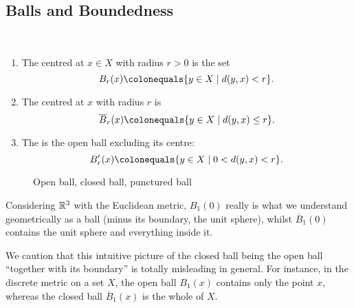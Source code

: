 \subsection{Balls and Boundedness}
\begin{definition}[Balls] \
\begin{enumerate}[label=(\roman*)]
\item The  centred at $x\in X$ with radius $r>0$ is the set
\[B_r(x)\colonequals\{y\in X\mid d(y,x)<r\}.\]
\item The  centred at $x$ with radius $r$ is
\[\overline{B}_r(x)\colonequals\{y\in X\mid d(y,x)\le r\}.\]
\item The  is the open ball excluding its centre:
\[B_r^\prime(x)\colonequals\{y\in X\mid 0<d(y,x)<r\}.\]
\end{enumerate}
\end{definition}

\begin{figure}[H]
\centering
{}
\caption{Open ball, closed ball, punctured ball}
\end{figure}

\begin{example}
Considering $\mathbb R^3$ with the Euclidean metric, $B_1(0)$ really is what we understand geometrically as a ball (minus its boundary, the unit sphere), whilst $\overline{B}_1(0)$ contains the unit sphere and everything inside it.
\end{example}

\begin{remark}
We caution that this intuitive picture of the closed ball being the open ball ``together with its boundary'' is totally misleading in general. For instance, in the discrete metric on a set $X$, the open ball $B_1(x)$ contains only the point $x$, whereas the closed ball $\overline{B}_1(x)$ is the whole of $X$.
\end{remark}

